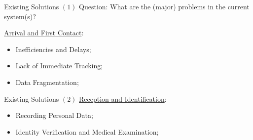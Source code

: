 \documentclass{beamer}
\begin{document}
\begin{frame}{Existing Solutions $(1)$}
\alert{Question}: What are the (major) problems in the current system(s)?\newline

\underline{Arrival and First Contact}: 
\vspace{-0.3cm}
	\begin{itemize}
		\item Inefficiencies and Delays; 
		\item Lack of Immediate Tracking; 
		\item Data Fragmentation; 
	\end{itemize}
\end{frame}



\begin{frame}{Existing Solutions $(2)$}
\underline{Reception and Identification}:
\vspace{-0.3cm}
\begin{itemize}
	\item Recording Personal Data; 
	\item Identity Verification and Medical Examination; 
\end{itemize}		
\end{frame}
\end{document}
